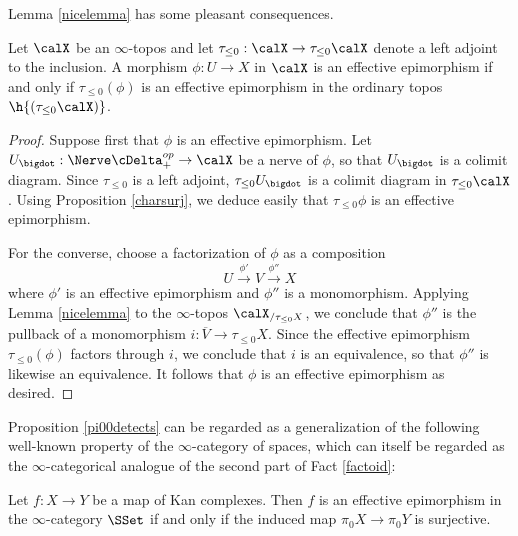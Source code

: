 Lemma \ref{nicelemma} has some pleasant consequences.

\begin{proposition}\label{pi00detects}
Let $\calX$ be an $\infty$-topos and let $\tau_{\leq 0} : \calX \rightarrow \tau_{\leq 0} \calX$
denote a left adjoint to the inclusion. A morphism $\phi: U \rightarrow X$ in $\calX$ is an effective epimorphism if and only if $\tau_{\leq 0}(\phi)$ is an effective epimorphism in the ordinary topos
$\h{(\tau_{\leq 0} \calX)}$.
\end{proposition}

\begin{proof}
Suppose first that $\phi$ is an effective epimorphism. Let $U_{\bigdot}: \Nerve \cDelta_{+}^{op} \rightarrow \calX$ be a \Cech nerve of $\phi$, so that $U_{\bigdot}$ is a colimit diagram.
Since $\tau_{\leq 0}$ is a left adjoint,
$\tau_{\leq 0} U_{\bigdot}$ is a colimit diagram in $\tau_{\leq 0} \calX$. 
Using Proposition \ref{charsurj}, we deduce easily that $\tau_{\leq 0} \phi$ is an effective epimorphism.

For the converse, choose a factorization of $\phi$ as a composition
$$ U \stackrel{\phi'}{\rightarrow} V \stackrel{\phi''}{\rightarrow} X$$
where $\phi'$ is an effective epimorphism and $\phi''$ is a monomorphism. Applying Lemma \ref{nicelemma} to the $\infty$-topos $\calX_{/ \tau_{\leq 0} X}$, we conclude that
$\phi''$ is the pullback of a monomorphism $i: \overline{V} \rightarrow \tau_{\leq 0} X$.
Since the effective epimorphism $\tau_{\leq 0}(\phi)$ factors through $i$, we conclude
that $i$ is an equivalence, so that $\phi''$ is likewise an equivalence. It follows that
$\phi$ is an effective epimorphism as desired.
\end{proof}

Proposition \ref{pi00detects} can be regarded as a generalization of the following well-known property of the $\infty$-category of spaces, which can itself be regarded as the $\infty$-categorical analogue of the second part of Fact \ref{factoid}:

\begin{corollary}
Let $f: X \rightarrow Y$ be a map of Kan complexes. Then $f$ is an effective epimorphism
in the $\infty$-category $\SSet$ if and only if the induced map $\pi_0 X \rightarrow \pi_0 Y$ is surjective.
\end{corollary}

